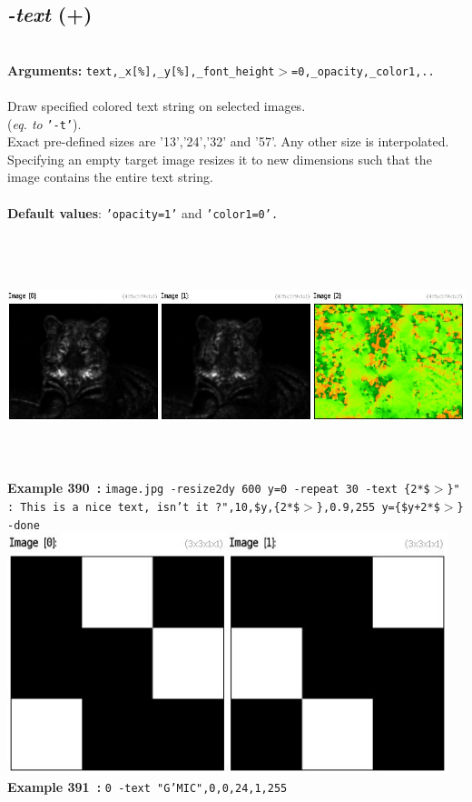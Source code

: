 \documentclass[a4paper,11pt,twoside]{book}
\begin{document}
\subsection{\emph{-text} (+)}\vspace*{-0.5em}
~\\\textbf{Arguments: } 
{\small \texttt{text,\_x[\%],\_y[\%],\_font\_height$>$=0,\_opacity,\_color1,..}}\\~\\
Draw specified colored text string on selected images.
~\\(\emph{eq. to} {\small \texttt{'-t'}}).
~\\Exact pre-defined sizes are '13','24','32' and '57'. Any other size is interpolated.
~\\Specifying an empty target image resizes it to new dimensions such that the image contains
the entire text string.
~\\~\\\textbf{Default values}: {\small \texttt{'opacity=1'} and \texttt{'color1=0'.}}
\begin{center}\includegraphics[keepaspectratio=true,height=7cm,width=\textwidth]{img/gmic_def390.jpg}\\
{\footnotesize \textbf{Example 390~:} \texttt{image.jpg -resize2dy 600 y=0 -repeat 30 -text \{2*\$$>$\}" : This is a nice text, isn't it ?",10,\$y,\{2*\$$>$\},0.9,255 y=\{\$y+2*\$$>$\} -done}}
\\\includegraphics[keepaspectratio=true,height=7cm,width=\textwidth]{img/gmic_def391.jpg}\\
{\footnotesize \textbf{Example 391~:} \texttt{0 -text "G'MIC",0,0,24,1,255}}
\end{center}
\end{document}
